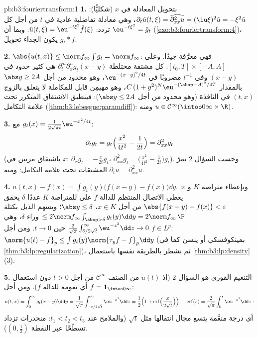 \begin{solution}{pb:b3:fouriertransform:1}
\textbf{1.} بتحويل المعادلة في $x$ (شكليًّا): $\partial_t\hat u(t,\xi) = \widehat{\partial^2_{xx}u} =
(\iu\xi)^2\hat u = -\xi^2\hat u$، وهي
معادلة تفاضلية عادية في $t$ من أجل كل تردد: $\hat u(t,\xi) = \eu^{-t\xi^2}\hat f(\xi)$. وبما أن
$\eu^{-t\xi^2} = \hat g_t$
(\cref{exo:b3:fouriertransform:4})، يكون الجداء تحويلَ $g_t * f$.

\textbf{2.} $\abs{u(t,x)} \leq \norm f_\infty\int g_t = \norm
f_\infty$: فهي معرَّفة جيدًا. وعلى $[t_0, T]\times[-A, A]$: كل مشتقة
مختلطة $\partial^m_t\partial^n_xg_t(x - y)$ هي كثير حدود في $(x - y)$ وفي $t^{-1}$ مضروبًا
في $\eu^{-(x-y)^2/4t}$، وهو محدود من أجل $\abs y \geq 2A$ بالمقدار $C\,(1 + y^2)^N\eu^{-(\abs y - A)^2/4T}$،
وهو مهيمِن قابل للمكاملة لا يتعلق بالزوج $(t, x)$ في النافذة (وهو
محدود من أجل $\abs y \leq 2A$): فينطبق الاشتقاق المتكرر تحت
علامة التكامل (\cref{thm:b3:lebesgue:paramdiff}): ومنه $u \in
\mathcal C^\infty(\intoo0\infty\times\R)$.

\textbf{3.} مع $g_t(x) = \frac1{2\sqrt{\pi
t}}\eu^{-x^2/4t}$:
\[
\partial_tg_t = g_t\Bigl(\frac{x^2}{4t^2} - \frac1{2t}\Bigr)
= \partial^2_{xx}g_t
\]
(باشتقاق مرتين في $x$: $\partial_xg_t = -\frac
x{2t}g_t$، $\partial^2_{xx}g_t = \bigl(\frac{x^2}{4t^2} -
\frac1{2t}\bigr)g_t$). وحسب السؤال 2 تمرّ
المشتقات تحت علامة التكامل: ومنه $\partial_tu = \partial^2_{xx}u$.

\textbf{4.} $u(t,x) - f(x) = \int g_t(y)\bigl(f(x - y) -
f(x)\bigr)\dd y$. وبإعطاء متراصة $K$ و $\varepsilon$: يعطي
الاتصال المنتظم للدالة $f$ على  للمتراصة $K$ عددًا $\delta$
يحقق $\abs{f(x-y) - f(x)} < \varepsilon$ من أجل $x \in
K$، $\abs y \leq \delta$؛ ويسهم الذيل بكتلة $\leq 2\norm
f_\infty\int_{\abs y > \delta}g_t(y)\dd y = 2\norm
f_\infty\,\P$
وراء $\delta$، وهي $\frac2{\sqrt\pi}\int_{\delta/2\sqrt t}^\infty\eu^{-z^2}\dd z
\to 0$ حين $t \to 0$. ومن أجل
$f \in L^p$: $\norm{u(t) - f}_p \leq
\int g_t(y)\norm{\tau_yf - f}_p\dd y$ (بمينكوفسكي أو ينسن كما في \cref{thm:b3:lp:regularization})،
ثم نشطر بالطريقة نفسها باستعمال \cref{thm:b3:lp:density}(3).

\textbf{5.} التنعيم الفوري هو السؤال 2 (إذ $u(t)$ من الصنف
$\mathcal C^\infty$ من أجل $t > 0$ دون استعمال أي نعومة للدالة $f$). ومن
أجل $f = \mathbf 1_{\intoo0\infty}$:
\[
u(t, x) = \int_0^\infty g_t(x - y)\dd y
= \frac1{\sqrt\pi}\int_{-x/2\sqrt t}^{\infty}\eu^{-z^2}\dd z
= \frac12\Bigl(1 +
\operatorname{erf}\Bigl(\frac{x}{2\sqrt t}\Bigr)\Bigr),
\quad \operatorname{erf}(s) =
\frac2{\sqrt\pi}\int_0^s\eu^{-z^2}\dd z :
\]
أي درجة منعَّمة يتسع مجال انتقالها مثل $\sqrt t$ (والملامح عند
$t_1 < t_2 < t_3$: منحدرات تزداد تسطّحًا عبر النقطة $(0, \frac12)$).


\end{solution}
